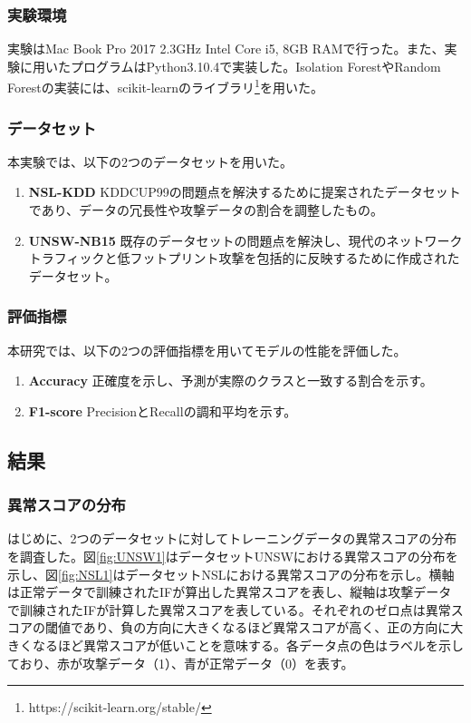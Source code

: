 \documentclass{css}
\begin{document}
\subsubsection{実験環境}

実験はMac Book Pro 2017 2.3GHz Intel Core i5, 8GB RAMで行った。また、実験に用いたプログラムはPython3.10.4で実装した。Isolation ForestやRandom Forestの実装には、scikit-learnのライブラリ\footnote[1]{https://scikit-learn.org/stable/}を用いた。

\subsubsection{データセット}
本実験では、以下の2つのデータセットを用いた。

\begin{enumerate}
    \item \textbf{NSL-KDD}
        KDDCUP99の問題点を解決するために提案されたデータセットであり、データの冗長性や攻撃データの割合を調整したもの。
    \item \textbf{UNSW-NB15}
        既存のデータセットの問題点を解決し、現代のネットワークトラフィックと低フットプリント攻撃を包括的に反映するために作成されたデータセット。
\end{enumerate}

\subsubsection{評価指標}
本研究では、以下の2つの評価指標を用いてモデルの性能を評価した。

\begin{enumerate}
    \item \textbf{Accuracy}
        正確度を示し、予測が実際のクラスと一致する割合を示す。
    \item \textbf{F1-score}
        PrecisionとRecallの調和平均を示す。
\end{enumerate}

\subsection{結果}

\subsubsection{異常スコアの分布}
はじめに、2つのデータセットに対してトレーニングデータの異常スコアの分布を調査した。図\ref{fig:UNSW1}はデータセットUNSWにおける異常スコアの分布を示し、図\ref{fig:NSL1}はデータセットNSLにおける異常スコアの分布を示し。横軸は正常データで訓練されたIFが算出した異常スコアを表し、縦軸は攻撃データで訓練されたIFが計算した異常スコアを表している。それぞれのゼロ点は異常スコアの閾値であり、負の方向に大きくなるほど異常スコアが高く、正の方向に大きくなるほど異常スコアが低いことを意味する。各データ点の色はラベルを示しており、赤が攻撃データ（1）、青が正常データ（0）を表す。
\end{document}
